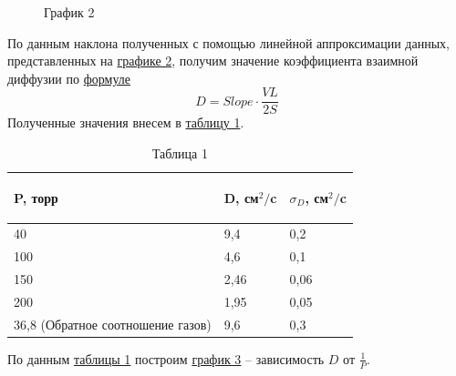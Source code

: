 \documentclass[a4paper]{article}
\begin{document}
\begin{figure}[h!]
\caption*{График 2}
\label{gr2}
\end{figure}

По данным наклона полученных с помощью линейной аппроксимации данных, представленных на \hyperref[gr2]{графике 2}, получим значение коэффициента взаимной диффузии по \hyperref[frl]{формуле}
\begin{equation}\label{frl} 
D = Slope \cdot \frac{VL}{2S}
\end{equation} 
Полученные значения внесем в \hyperref[tb1]{таблицу 1}.

\begin{table}[h]
\centering
\caption*{Таблица 1}
\begin{tabular}{|l|l|l|}
\hline
\label{tb1}

P, торр & D, см$^2 /$c & $\sigma_D$, см$^2 /$c \\ \hline
40 & 9,4 & 0,2 \\ \hline
100 & 4,6 & 0,1 \\ \hline
150 & 2,46 & 0,06 \\ \hline
200 & 1,95 & 0,05 \\ \hline
36,8 (Обратное соотношение газов) & 9,6 & 0,3 \\ \hline

\end{tabular}
\end{table}

\clearpage
По данным \hyperref[tb1]{таблицы 1} построим \hyperref[gr3]{график 3} -- зависимость $D$ от $\frac{1}{P}$.
\end{document}
